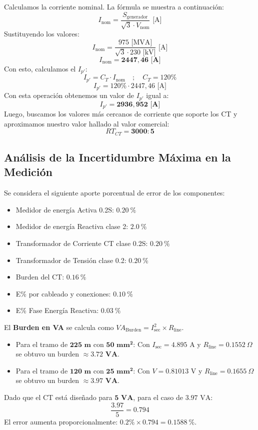 Calculamos la corriente nominal. La fórmula se muestra a continuación:
$$I_{\text{nom}} = \frac{S_{\text{generador}}}{\sqrt{3} \cdot V_{\text{nom}}} \text{ [A]} \text{}$$
Sustituyendo los valores:
$$I_{\text{nom}} = \frac{975 \text{ [MVA]}}{\sqrt{3} \cdot 230 \text{ [kV]}} \text{ [A]} \text{}$$
$$I_{\text{nom}} = \mathbf{2447,46 \text{ [A]}} \text{}$$
Con esto, calculamos el $I_{p'}$:
$$I_{p'} = C_T \cdot I_{\text{nom}} \quad; \quad C_T = 120\% \text{}$$
$$I_{p'} = 120\% \cdot 2447,46 \text{ [A]} \text{}$$
Con esta operación obtenemos un valor de $I_{p'}$ igual a:
$$I_{p'} = \mathbf{2936,952 \text{ [A]}} \text{}$$
Luego, buscamos los valores más cercanos de corriente que soporte los CT y aproximamos nuestro valor hallado al valor comercial:
$$R T_{CT} = \mathbf{3000:5} \text{}$$

\subsection{Análisis de la Incertidumbre Máxima en la Medición} \label{subsec:analisis_incertidumbre}
Se considera el siguiente aporte porcentual de error de los componentes:
\begin{itemize}
    \item Medidor de energía Activa 0.2S: $\mathbf{0.20 \ \%}$
    \item Medidor de energía Reactiva clase 2: $\mathbf{2.0 \ \%}$
    \item Transformador de Corriente CT clase 0.2S: $\mathbf{0.20 \ \%}$
    \item Transformador de Tensión clase 0.2: $\mathbf{0.20 \ \%}$
    \item Burden del CT: $\mathbf{0.16 \ \%}$
    \item E\% por cableado y conexiones: $\mathbf{0.10 \ \%}$
    \item E\% Fase Energía Reactiva: $\mathbf{0.03 \ \%}$
\end{itemize}

El \textbf{Burden en VA} se calcula como $V A_{\text{Burden}} = I_{\text{sec}}^2 \times R_{\text{line}}$.
\begin{itemize}
    \item Para el tramo de $\mathbf{225 \text{ m}}$ con $\mathbf{50 \text{ mm}^2}$: Con $I_{\text{sec}}=4.895 \text{ A}$ y $R_{\text{line}}=0.1552 \ \Omega$ se obtuvo un burden $\approx \mathbf{3.72 \text{ VA}}$.
    \item Para el tramo de $\mathbf{120 \text{ m}}$ con $\mathbf{25 \text{ mm}^2}$: Con $V=0.81013 \text{ V}$ y $R_{\text{line}}=0.1655 \ \Omega$ se obtuvo un burden $\approx \mathbf{3.97 \text{ VA}}$.
\end{itemize}
Dado que el CT está diseñado para $\mathbf{5 \text{ VA}}$, para el caso de $3.97 \text{ VA}$:
$$\frac{3.97}{5} = 0.794 \text{}$$
El error aumenta proporcionalmente: $0.2\% \times 0.794 = \mathbf{0.1588 \ \%}$.


